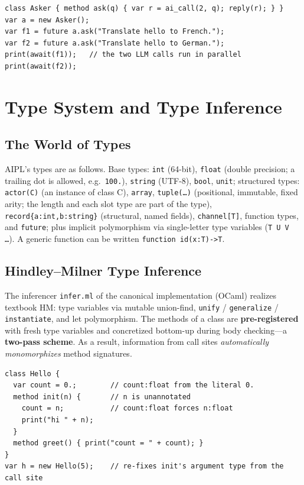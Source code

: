 \documentclass[11pt,a4paper]{article}
\newcommand{\code}[1]{\texttt{\small #1}}
\begin{document}
\begin{lstlisting}[caption={Parallel queries via LLM $\times$ future},label={lst:ai},float=h]
class Asker { method ask(q) { var r = ai_call(2, q); reply(r); } }
var a = new Asker();
var f1 = future a.ask("Translate hello to French.");
var f2 = future a.ask("Translate hello to German.");
print(await(f1));   // the two LLM calls run in parallel
print(await(f2));
\end{lstlisting}

\section{Type System and Type Inference}\label{sec:type}

\subsection{The World of Types}
AIPL's types are as follows. Base types: \code{int} (64-bit),
\code{float} (double precision; a trailing dot is allowed, e.g.\
\code{100.}), \code{string} (UTF-8), \code{bool}, \code{unit};
structured types: \code{actor(C)} (an instance of class C),
\code{array}, \code{tuple(\dots)} (positional, immutable, fixed arity;
the length and each slot type are part of the type),
\code{record\{a:int,b:string\}} (structural, named fields),
\code{channel[T]}, function types, and \code{future}; plus implicit
polymorphism via single-letter type variables (\code{T U V \dots}).
A generic function can be written \code{function id(x:T)->T}.

\subsection{Hindley--Milner Type Inference}\label{sec:infer}
The inferencer \code{infer.ml} of the canonical implementation (OCaml)
realizes textbook HM: type variables via mutable union-find,
\code{unify} / \code{generalize} / \code{instantiate}, and let
polymorphism. The methods of a class are \textbf{pre-registered} with
fresh type variables and concretized bottom-up during body checking---a
\textbf{two-pass scheme}. As a result, information from call sites
\emph{automatically monomorphizes} method signatures.

\begin{lstlisting}[caption={No annotations = full inference; call sites fix the types},label={lst:infer},float=h]
class Hello {
  var count = 0.;        // count:float from the literal 0.
  method init(n) {       // n is unannotated
    count = n;           // count:float forces n:float
    print("hi " + n);
  }
  method greet() { print("count = " + count); }
}
var h = new Hello(5);    // re-fixes init's argument type from the call site
\end{lstlisting}
\end{document}
